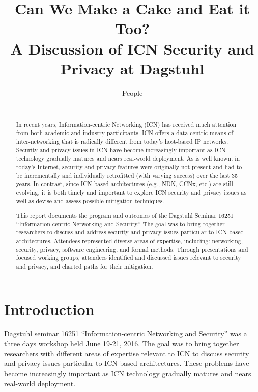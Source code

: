 \documentclass{sig-alternate-10pt}
\begin{document}
\title{Can We Make a Cake and Eat it Too? \\ A Discussion of ICN Security and Privacy at Dagstuhl}

\author{
\alignauthor
People \\
\\
}

\maketitle

\begin{abstract}
In recent years, Information-centric Networking (ICN) has received much attention from
both academic and industry participants. ICN offers a data-centric means of inter-networking
that is radically different from today's host-based IP networks. Security and privacy issues
in ICN have become increasingly important as ICN technology gradually matures and nears
real-world deployment. As is well known, in today's Internet, security and privacy features
were originally not present and had to be incrementally and individually retrofitted
(with varying success) over the last 35 years. In contrast, since ICN-based architectures
(e.g., NDN, CCNx, etc.) are still evolving, it is both timely and important to explore
ICN security and privacy issues as well as devise and assess possible mitigation techniques.

This report documents the program and outcomes of the Dagstuhl Seminar 16251
``Information-centric Networking and Security.'' The goal was to bring together
researchers to discuss and address security and privacy issues particular to ICN-based
architectures. Attendees represented diverse areas of expertise, including: networking,
security, privacy, software engineering, and formal methods. Through presentations and
focused working groups, attendees identified and discussed issues relevant to security
and privacy, and charted paths for their mitigation.
\end{abstract}

\section{Introduction}
Dagstuhl seminar 16251 ``Information-centric Networking and Security'' was a three days
workshop held June 19-21, 2016. The goal was to bring together researchers with
different areas of expertise relevant to ICN to discuss security and privacy issues
particular to ICN-based architectures. These problems have become increasingly
important as ICN technology gradually matures and nears real-world deployment.
\end{document}
